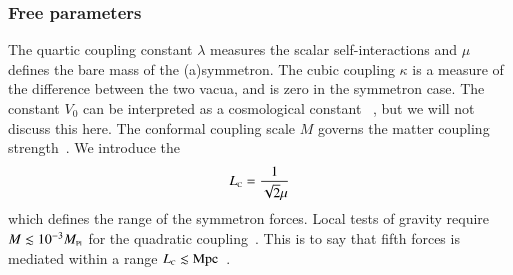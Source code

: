 
    \subsubsection{Free parameters}




    The quartic coupling constant $\lambda$ measures the scalar self-interactions and $\mu$ defines the bare mass of the (a)symmetron. The cubic coupling $\kappa$ is a measure of the difference between the two vacua, and is zero in the symmetron case. The constant $V_0$ can be interpreted as a cosmological constant \textLambda~\citep{christiansenAsevolutionRelativisticNbody2023}, but we will not discuss this here. The conformal coupling scale $M$ governs the matter coupling strength~\citep{burrageAccurateComputationScreening2024}. We introduce the 
    \begin{equation}\label{eq:cosmo:quintessence:symmetron_Compton_wavelength}
        L_{\text{\tiny{C}}} = \frac{1}{\sqrt{2}\mu}
    \end{equation}
    which defines the range of the symmetron forces. %
    Local tests of gravity require $M \lesssim 10^{-3} M_{\text{\tiny{Pl}}}$ for the quadratic coupling~\citep{burrageAccurateComputationScreening2024,hinterbichlerSymmetronCosmology2011,hinterbichlerScreeningLongRangeForces2010}. This is to say that fifth forces is mediated within a range $L_{\text{\tiny{C}}}\lesssim\mathrm{Mpc}$~\citep{hinterbichlerScreeningLongRangeForces2010}.



    








    








    